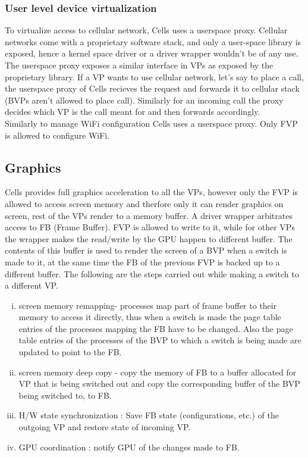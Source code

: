 \documentclass[a4paper,10pt]{article}
\begin{document}
\subsubsection*{User level device virtualization}
To virtualize access to cellular network, Cells uses a userspace proxy. Cellular networks come with a proprietary software stack, and only a user-space library is exposed, hence a kernel space driver or a driver wrapper wouldn't be of any use.
The userspace proxy exposes a similar interface in VPs as exposed by the proprietary library. If a VP wants to use cellular network, let's say to place a call, the userspace proxy of Cells recieves the request and forwards it to cellular stack (BVPs aren't allowed to place call). Similarly for an incoming
call the proxy decides which VP is the call meant for and then forwards accordingly.
\\Similarly to manage WiFi configuration Cells uses a userspace proxy. Only FVP is allowed to configure WiFi.
\subsection*{Graphics}
Cells provides full graphics acceleration to all the VPs, however only the FVP is allowed to access screen memory and therfore only it can render graphics on screen, rest of the VPs render
to a memory buffer. A driver wrapper arbitrates access to FB (Frame Buffer). FVP is allowed to write to it, while for other VPs the wrapper makes the read/write by the GPU happen to different buffer. The contents of
this buffer is used to render the screen of a BVP when a switch is made to it, at the same time the FB of the previous FVP is backed up to a different buffer.
The following are the steps carried out while making a switch to a different VP.
\begin{enumerate}[(i)]
 \item screen memory remapping- processes map part of frame buffer to their memory to access it directly, thus when a switch is made the page table entries of the processes mapping the FB
 have to be changed. Also the page table entries of the processes of the BVP to which a switch is being made are updated to point to the FB.
 \item screen memory deep copy - copy the memory of FB to a buffer allocated for VP that is being switched out and copy the corresponding buffer of the BVP being switched to, to FB.
 \item H/W state synchronization : Save FB state (configurations, etc.) of the outgoing VP and restore state of incoming VP.
 \item GPU coordination :  notify GPU of the changes made to FB.
\end{enumerate}
\end{document}
